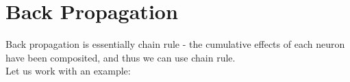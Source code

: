\documentclass{article}
\begin{document}
\section{Back Propagation}
	Back propagation is essentially chain rule - the cumulative effects of each neuron have been composited, and thus we can use chain rule. \\
	Let us work with an example: \\
\end{document}
